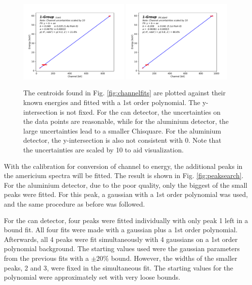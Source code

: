 \begin{figure}[htb]
  \includegraphics[width=0.49\textwidth,page=1]{graphics/energychannelcalib.pdf}
  \includegraphics[width=0.49\textwidth,page=1]{graphics/aluenergychannelcalib.pdf}
  \caption{The centroids found in Fig. \ref{fig:channelfits} are plotted against their known energies and fitted with a 1st order polynomial. The y-intersection is not fixed. For the can detector, the uncertainties on the data points are reasonable, while for the aluminium detector, the large uncertainties lead to a smaller Chisquare. For the aluminium detector, the y-intersection is also not consistent with 0. Note that the uncertainties are scaled by 10 to aid visualization.}
  \label{fig:energychannelcalib}
\end{figure}

With the calibration for conversion of channel to energy, the additional peaks in the americium spectra will be fitted. The result is shown in Fig. \ref{fig:peaksearch}. For the aluminium detector, due to the poor quality, only the biggest of the small peaks were fitted. For this peak, a gaussian with a 1st order polynomial was used, and the same procedure as before was followed.

For the can detector, four peaks were fitted individually with only peak 1 left in a bound fit. All four fits were made with a gaussian plus a 1st order polynomial. Afterwards, all 4 peaks were fit simultaneously with 4 gaussians on a 1st order polynomial background. The starting values used were the gaussian parameters from the previous fits with a $\pm 20\%$ bound. However, the widths of the smaller peaks, 2 and 3, were fixed in the simultaneous fit. The starting values for the polynomial were approximately set with very loose bounds.

